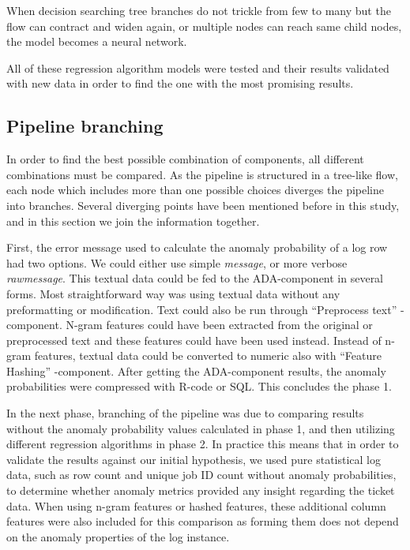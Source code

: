 When decision searching tree branches do not trickle from few to many
but the flow can contract and widen again,
or multiple nodes can reach same child nodes,
the model becomes a neural network.

All of these regression algorithm models
were tested and their results validated with new data
in order to find the one with the most promising results.




\subsection{Pipeline branching}\label{subsec:pipe-branching}

In order to find the best possible combination of components,
all different combinations must be compared.
As the pipeline is structured in a tree-like flow,
each node which includes more than one possible choices
diverges the pipeline into branches.
Several diverging points have been mentioned before in this study,
and in this section we join the information together.

First,
the error message used to calculate the anomaly probability of a log row
had two options.
We could either use simple \textit{message},
or more verbose \textit{rawmessage}.
This textual data could be fed to the ADA-component in several forms.
Most straightforward way was using textual data without any preformatting or modification.
Text could also be run through \enquote{Preprocess text} -component.
N-gram features could have been extracted from the original or preprocessed text
and these features could have been used instead.
Instead of n-gram features,
textual data could be converted to numeric
also with \enquote{Feature Hashing} -component.
After getting the ADA-component results,
the anomaly probabilities were compressed with R-code or SQL.\@
This concludes the phase 1.

In the next phase,
branching of the pipeline was due to
comparing results without the anomaly probability values calculated in phase 1,
and then utilizing different regression algorithms in phase 2.
In practice this means
that in order to validate the results against our initial hypothesis,
we used pure statistical log data,
such as row count and unique job ID count
without anomaly probabilities,
to determine whether anomaly metrics provided any insight regarding the ticket data.
When using n-gram features or hashed features,
these additional column features were also included for this comparison
as forming them does not depend on the anomaly properties of the log instance.


